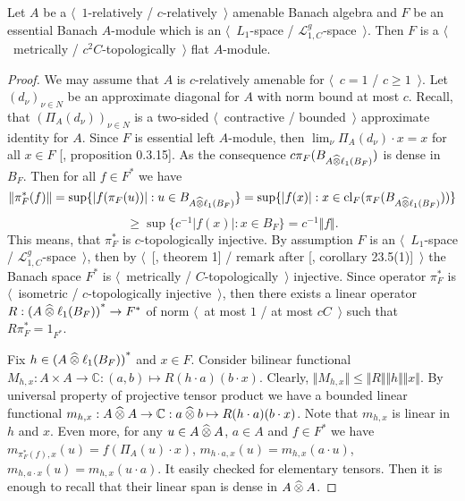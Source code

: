 \begin{proposition}\label{MetTopEssL1FlatModAoverAmenBanAlg} Let $A$ be a
$\langle$~$1$-relatively / $c$-relatively~$\rangle$ amenable Banach algebra and
$F$ be an essential Banach $A$-module which is an $\langle$~$L_1$-space /
$\mathscr{L}_{1,C}^g$-space~$\rangle$. Then $F$ is a $\langle$~metrically /
$c^2C$-topologically~$\rangle$ flat $A$-module.
\end{proposition}
\begin{proof} We may assume that $A$ is $c$-relatively amenable for
$\langle$~$c=1$ / $c\geq 1$~$\rangle$. Let ${(d_\nu)}_{\nu\in N}$ be an
approximate diagonal for $A$ with norm bound at most $c$. Recall, that
${(\Pi_A(d_\nu))}_{\nu\in N}$ is a two-sided $\langle$~contractive /
bounded~$\rangle$ approximate identity for $A$. Since $F$ is essential left
$A$-module, then $\lim_{\nu}\Pi_A(d_\nu)\cdot x=x$ for all $x\in F$
[\cite{HelHomolBanTopAlg}, proposition 0.3.15]. As the consequence
$c\pi_F(B_{A\mathbin{\widehat{\otimes}}\ell_1(B_F)})$ is dense in $B_F$. Then for all $f\in F^*$
we have
$$
\Vert\pi_F^*(f)\Vert
=\sup \{|f(\pi_F(u))|:u\in B_{A\mathbin{\widehat{\otimes}}\ell_1(B_F)} \}
=\sup \{|f(x)|:x\in \operatorname{cl}_F(\pi_F(B_{A\mathbin{\widehat{\otimes}}\ell_1(B_F)})) \}
$$
$$
\geq\sup \{c^{-1}|f(x)|:x\in B_F \}=c^{-1}\Vert f\Vert.
$$
This means, that $\pi_F^*$ is $c$-topologically injective. By assumption $F$ is
an $\langle$~$L_1$-space / $\mathscr{L}_{1,C}^g$-space~$\rangle$, then by
$\langle$~[\cite{GrothMetrProjFlatBanSp}, theorem 1] / remark after
[\cite{DefFloTensNorOpId}, corollary 23.5(1)]~$\rangle$ the Banach space $F^*$
is $\langle$~metrically / $C$-topologically~$\rangle$ injective. Since operator
$\pi_F^*$ is $\langle$~isometric / $c$-topologically injective~$\rangle$, then
there exists a linear operator $R:{(A\mathbin{\widehat{\otimes}}\ell_1(B_F))}^*\to F^*$ of norm
$\langle$~at most $1$ / at most $cC$~$\rangle$ such that $R\pi_F^*=1_{F^*}$.

Fix $h\in {(A\mathbin{\widehat{\otimes}}\ell_1(B_F))}^*$ and $x\in F$. Consider bilinear
functional $M_{h,x}:A\times A\to\mathbb{C}:(a,b)\mapsto R(h\cdot a)(b\cdot x)$.
Clearly, $\Vert M_{h,x}\Vert\leq\Vert R\Vert\Vert h\Vert\Vert x\Vert$. By
universal property of projective tensor product we have a bounded linear
functional 
$m_{h,x}:A\mathbin{\widehat{\otimes}} A\to\mathbb{C}:a\mathbin{\widehat{\otimes}} b\mapsto R(h\cdot a)(b\cdot x)$. 
Note that $m_{h,x}$ is linear in $h$ and $x$. Even more, for any
$u\in A\mathbin{\widehat{\otimes}} A$, $a\in A$ and $f\in F^*$ we have
$m_{\pi_F^*(f),x}(u)=f(\Pi_A(u)\cdot x)$, $m_{h\cdot a,x}(u)=m_{h,x}(a\cdot u)$,
$m_{h,a\cdot x}(u)=m_{h,x}(u\cdot a)$. It easily checked for elementary tensors.
Then it is enough to recall that their linear span is dense in $A\mathbin{\widehat{\otimes}} A$.


\end{proof}
